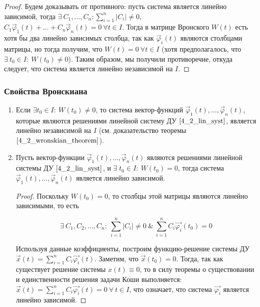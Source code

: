 \begin{proof}
    Будем доказывать от противного: пусть система является линейно зависимой, тогда $\exists ~ C_1, \dots, C_n: \sum^n_{i = 1} |C_i| \neq 0$,
    $C_1 \overrightarrow \varphi_1(t) + \dots + C_n \overrightarrow \varphi_n(t) = 0 ~ \forall t \in I$. Тогда в матрице Вронского $W(t)$
    есть хотя бы два линейно зависимых столбца, так как $\overrightarrow \varphi_i(t)$ являются столбцами матрицы, но тогда получим, что
    $W(t) = 0 ~ \forall t \in I$ (хотя предполагалось, что $\exists ~ t_0 \in I : ~ W(t_0) \neq 0$). Таким образом, мы получили противоречие,
    откуда следует, что система является линейно независимой на $I$.
\end{proof}

\subsubsection{Свойства Вронскиана}
\label{wr_properties}

\begin{enumerate}
    \item Если $\exists t_0 \in I : ~ W(t_0) \neq 0$, то система вектор-функций $\overrightarrow \varphi_1(t), \dots, \overrightarrow \varphi_n(t)$, которые являются решениями линейной систему ДУ $\eqref{4_2_lin_syst}$, является линейно независимой на $I$ (см. доказательство теоремы $\eqref{4_2_wronskian_theorem}$).
    \item Пусть вектор-функции $\overrightarrow \varphi_1(t), \dots, \overrightarrow \varphi_n(t)$ являются решениями линейной системы ДУ $\eqref{4_2_lin_syst}$, и $\exists \; t_0 \in I: ~ W(t_0) = 0$, тогда система $\overrightarrow \varphi_1(t), \dots, \overrightarrow \varphi_n(t)$ является линейно зависимой.

    \begin{proof}
        Поскольку $W(t_0) = 0$, то столбцы этой матрицы являются линейно зависимыми, то есть
        
        \[ \exists ~ C_1, C_2, \dots, C_n : ~ \sum_{i = 1}^n |C_i| \neq 0 ~ \& ~ \sum_{i = 1}^n C_i \overrightarrow{\varphi_i}(t_0) = 0 \]
        
        Используя данные коэффициенты, построим функцию-решение системы ДУ $\overrightarrow{x}(t) = \sum_{i = 1}^n C_i \overrightarrow{\varphi_i}(t)$. Заметим, что $\overrightarrow{x}(t_0) = 0$. Тогда, так как существует решение системы $x(t) \equiv 0$, то в силу теоремы о существовании и единственности решения задачи Коши выполняется: $\overrightarrow{x}(t) = \sum_{i = 1}^n C_i \overrightarrow{\varphi_i}(t) = 0 ~ \forall ~ t \in I$, что означает, что система $\overrightarrow{\varphi_i}$ является линейно зависимой.
    \end{proof}
    
\end{enumerate}
